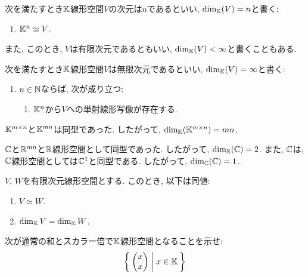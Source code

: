 \begin{definition}
次を満たすとき$\mathbb{K}$線形空間$V$の次元は$n$であるといい,
$\dim_{\mathbb{K}}(V)=n$と書く:
\begin{enumerate}
\item $\mathbb{K}^n\simeq V$.
\end{enumerate}
また,
このとき,
$V$は有限次元であるともいい, $\dim_{\mathbb{K}}(V)<\infty$と書くこともある.
\end{definition}

\begin{definition}
次を満たすとき$\mathbb{K}$線形空間$V$は無限次元であるといい,
$\dim_{\mathbb{K}}(V)=\infty$と書く:
\begin{enumerate}
\item $n\in \mathbb{N}$ならば, 次が成り立つ:
\begin{enumerate}
\item $\mathbb{K}^n$から$V$への単射線形写像が存在する.
\end{enumerate}
\end{enumerate}
\end{definition}

\begin{example}
$\mathbb{K}^{m\times n}$と$\mathbb{K}^{mn}$は同型であった.
したがって,
$\dim_{\mathbb{K}}(\mathbb{K}^{m\times n})=mn$.
\end{example}

\begin{example}
$\mathbb{C}$と$\mathbb{R}^{mn}$と$\mathbb{R}$線形空間として同型であった.
したがって,
$\dim_{\mathbb{R}}(\mathbb{C})=2$.
また,
$\mathbb{C}$は,
$\mathbb{C}$線形空間としては$\mathbb{C}^1$と同型である.
したがって,
$\dim_{\mathbb{C}}(\mathbb{C})=1$.
\end{example}

\begin{prop}
  $V$, $W$を有限次元線形空間とする.
  このとき, 以下は同値:
  \begin{enumerate}
  \item $V\simeq W$.
  \item $\dim_{\mathbb{K}} V = \dim_{\mathbb{K}} W$.
  \end{enumerate}
\end{prop}


\begin{quiz}
  次が通常の和とスカラー倍で$\mathbb{K}$線形空間となることを示せ:
  \begin{align*}
    \Set{\begin{pmatrix}x\\x\end{pmatrix}|x\in\mathbb{K}}
  \end{align*}
\end{quiz}

